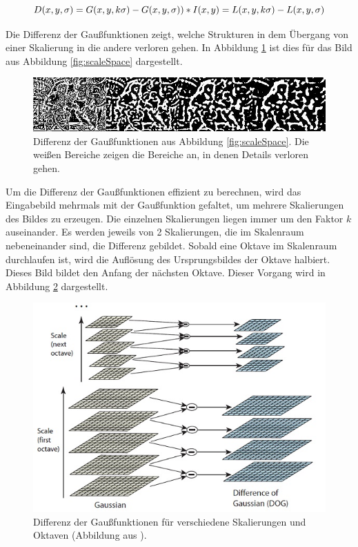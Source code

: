 \[
D(x, y, \sigma) = G(x, y, k\sigma) - G(x, y, \sigma)) * I(x, y)\\ = L(x, y, k\sigma) - L(x, y, \sigma)
\]

Die Differenz der Gaußfunktionen zeigt, welche Strukturen in dem Übergang von einer Skalierung in die andere verloren gehen. In Abbildung \ref{fig:dogSample} ist dies für das Bild aus Abbildung \ref{fig:scaleSpace} dargestellt.

\begin{figure}[h]
    \centering
		\includegraphics[scale=0.55]{bilder/firstDiv.png}
    	\caption{Differenz der Gaußfunktionen aus Abbildung \ref{fig:scaleSpace}. Die weißen Bereiche zeigen die Bereiche an, in denen Details verloren gehen.}

\label{fig:dogSample}
\end{figure}


Um die Differenz der Gaußfunktionen effizient zu berechnen, wird das Eingabebild mehrmals mit der Gaußfunktion gefaltet, um mehrere Skalierungen des Bildes zu erzeugen. Die einzelnen Skalierungen liegen immer um den Faktor $k$ auseinander.  Es werden jeweils von 2 Skalierungen, die im Skalenraum nebeneinander sind, die Differenz gebildet.
Sobald eine Oktave im Skalenraum durchlaufen ist, wird die Auflösung des Ursprungsbildes der Oktave halbiert. Dieses Bild bildet den Anfang der nächsten Oktave.
Dieser Vorgang wird in Abbildung \ref{fig:siftDog} dargestellt.

\begin{figure}[h]
    \centering
		\includegraphics[scale=0.8]{bilder/sift-dog-idea.jpg}
    	\caption{Differenz der Gaußfunktionen für verschiedene Skalierungen und Oktaven (Abbildung aus \cite[S. 6]{Lowe2004}).}
\label{fig:siftDog}
\end{figure}

